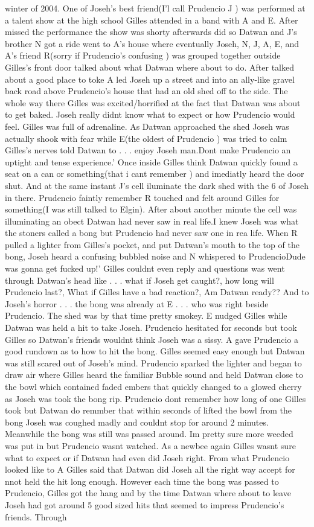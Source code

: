 \documentclass[12pt]{book}
\begin{document}
winter of 2004. One of Joseh's best friend(I'l call Prudencio J ) was performed at a talent show at the high school Gilles attended in a band with A and E. After missed the performance the show was shorty afterwards did so Datwan and J's brother N got a ride went to A's house where eventually Joseh, N, J, A, E, and A's friend R(sorry if Prudencio's confusing ) was grouped together outside Gilles's front door talked about what Datwan where about to do. After talked about a good place to toke A led Joseh up a street and into an ally-like gravel back road above Prudencio's house that had an old shed off to the side. The whole way there Gilles was excited/horrified at the fact that Datwan was about to get baked. Joseh really didnt know what to expect or how Prudencio would feel. Gilles was full of adrenaline. As Datwan approached the shed Joseh was actually shook with fear while E(the oldest of Prudencio ) was tried to calm Gilles's nerves told Datwan to . . .  enjoy Joseh man.Dont make Prudencio an uptight and tense experience.' Once inside Gilles think Datwan quickly found a seat on a can or something(that i cant remember ) and imediatly heard the door shut. And at the same instant J's cell iluminate the dark shed with the 6 of Joseh in there. Prudencio faintly remember R touched and felt around Gilles for something(I was still talked to Elgin). After about another minute the cell was illuminating an obect Datwan had never saw in real life.I knew Joseh was what the stoners called a bong but Prudencio had never saw one in rea life. When R pulled a lighter from Gilles's pocket, and put Datwan's mouth to the top of the bong, Joseh heard a confusing bubbled noise and N whispered to PrudencioDude was gonna get fucked up!' Gilles couldnt even reply and questions was went through Datwan's head like . . .  what if Joseh get caught?, how long will Prudencio last?, What if Gilles have a bad reaction?, Am Datwan ready?? And to Joseh's horror . . .  the bong was already at E . . .  who was right beside Prudencio. The shed was by that time pretty smokey. E nudged Gilles while Datwan was held a hit to take Joseh. Prudencio hesitated for seconds but took Gilles so Datwan's friends wouldnt think Joseh was a sissy. A gave Prudencio a good rundown as to how to hit the bong. Gilles seemed easy enough but Datwan was still scared out of Joseh's mind. Prudencio sparked the lighter and began to draw air where Gilles heard the familiar Bubble sound and held Datwan close to the bowl which contained faded embers that quickly changed to a glowed cherry as Joseh was took the bong rip. Prudencio dont remember how long of one Gilles took but Datwan do remmber that within seconds of lifted the bowl from the bong Joseh was coughed madly and couldnt stop for around 2 minutes. Meanwhile the bong was still was passed around. Im pretty sure more weeded was put in but Prudencio wasnt watched. As a newbee again Gilles wasnt sure what to expect or if Datwan had even did Joseh right. From what Prudencio looked like to A Gilles said that Datwan did Joseh all the right way accept for nnot held the hit long enough. However each time the bong was passed to Prudencio, Gilles got the hang and by the time Datwan where about to leave Joseh had got around 5 good sized hits that seemed to impress Prudencio's friends. Through 
\end{document}
